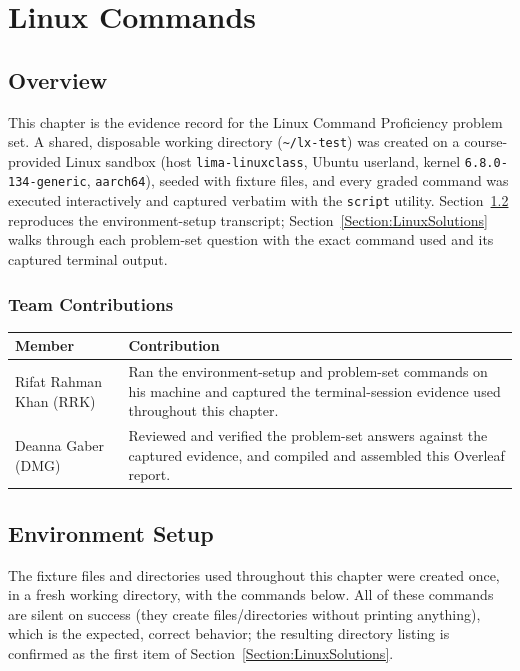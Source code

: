 \chapter{Linux Commands}

\section{Overview}
This chapter is the evidence record for the Linux Command Proficiency
problem set. A shared, disposable working directory (\texttt{\textasciitilde/lx-test})
was created on a course-provided Linux sandbox (host \texttt{lima-linuxclass},
Ubuntu userland, kernel \texttt{6.8.0-134-generic}, \texttt{aarch64}), seeded with
fixture files, and every graded command was executed interactively and
captured verbatim with the \texttt{script} utility. Section~\ref{Section:LinuxSetup}
reproduces the environment-setup transcript; Section~\ref{Section:LinuxSolutions}
walks through each problem-set question with the exact command used and its
captured terminal output.

\subsection{Team Contributions}
\begin{tabularx}{\linewidth}{L{4.0cm}Y}
\toprule \textbf{Member} & \textbf{Contribution}\\ \midrule
Rifat Rahman Khan (RRK) & Ran the environment-setup and problem-set commands on his machine and captured the terminal-session evidence used throughout this chapter.\\
Deanna Gaber (DMG) & Reviewed and verified the problem-set answers against the captured evidence, and compiled and assembled this Overleaf report.\\ \bottomrule
\end{tabularx}

\section{Environment Setup}
\label{Section:LinuxSetup}
The fixture files and directories used throughout this chapter were created
once, in a fresh working directory, with the commands below. All of these
commands are silent on success (they create files/directories without
printing anything), which is the expected, correct behavior; the resulting
directory listing is confirmed as the first item of Section~\ref{Section:LinuxSolutions}.

